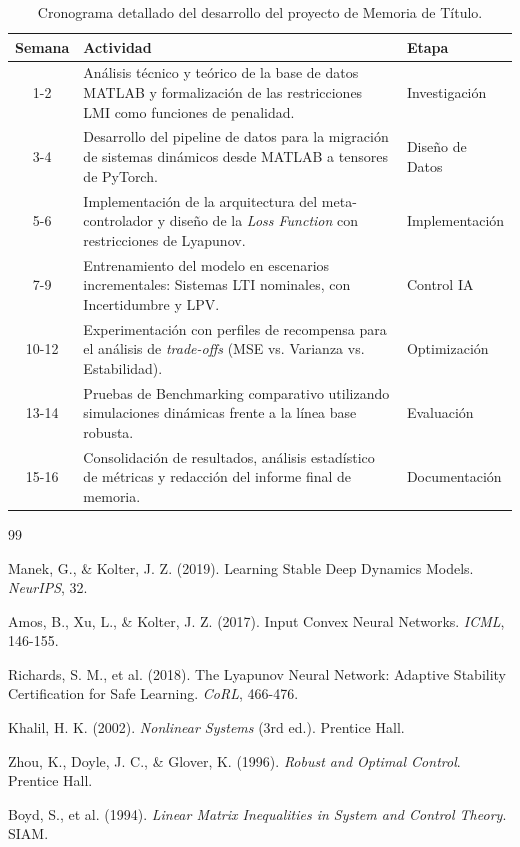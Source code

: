 \documentclass[12pt,twoside]{report}
\begin{document}
\begin{table}[ht]
    \centering
    \small
    \begin{tabular}{|c|p{8.5cm}|l|}
        \hline
        \textbf{Semana} & \textbf{Actividad} & \textbf{Etapa} \\ \hline
        1-2 & Análisis técnico y teórico de la base de datos MATLAB y formalización de las restricciones LMI como funciones de penalidad. & Investigación \\ \hline
        3-4 & Desarrollo del pipeline de datos para la migración de sistemas dinámicos desde MATLAB a tensores de PyTorch. & Diseño de Datos \\ \hline
        5-6 & Implementación de la arquitectura del meta-controlador y diseño de la \textit{Loss Function} con restricciones de Lyapunov. & Implementación \\ \hline
        7-9 & Entrenamiento del modelo en escenarios incrementales: Sistemas LTI nominales, con Incertidumbre y LPV. & Control IA \\ \hline
        10-12 & Experimentación con perfiles de recompensa para el análisis de \textit{trade-offs} (MSE vs. Varianza vs. Estabilidad). & Optimización \\ \hline
        13-14 & Pruebas de Benchmarking comparativo utilizando simulaciones dinámicas frente a la línea base robusta. & Evaluación \\ \hline
        15-16 & Consolidación de resultados, análisis estadístico de métricas y redacción del informe final de memoria. & Documentación \\ \hline
    \end{tabular}
    \caption{Cronograma detallado del desarrollo del proyecto de Memoria de Título.}
    \label{tab:cronograma}
\end{table}

\begin{thebibliography}{99}

Manek, G., \& Kolter, J. Z. (2019). Learning Stable Deep Dynamics Models. \textit{NeurIPS}, 32.

Amos, B., Xu, L., \& Kolter, J. Z. (2017). Input Convex Neural Networks. \textit{ICML}, 146-155.

Richards, S. M., et al. (2018). The Lyapunov Neural Network: Adaptive Stability Certification for Safe Learning. \textit{CoRL}, 466-476.

Khalil, H. K. (2002). \textit{Nonlinear Systems} (3rd ed.). Prentice Hall.

Zhou, K., Doyle, J. C., \& Glover, K. (1996). \textit{Robust and Optimal Control}. Prentice Hall.

Boyd, S., et al. (1994). \textit{Linear Matrix Inequalities in System and Control Theory}. SIAM.

\end{thebibliography}
\end{document}
